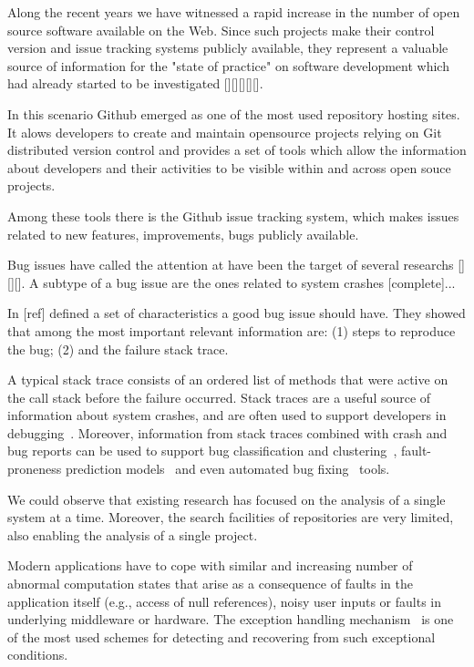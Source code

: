 \documentclass[conference]{IEEEtran}
\begin{document}
Along the recent years we have witnessed a rapid increase in 
the number of open source software  available on the Web.
Since such projects make their control version and 
issue tracking systems publicly available, they represent a valuable 
source of information for the "state of practice" on software development
which had already started to be investigated [][][][][].

In this scenario Github emerged as one of the most used repository hosting sites.
It  alows developers to create and maintain opensource projects relying on Git distributed version 
control and provides a set of tools which allow the information about developers 
and their activities to be visible within and across open souce projects.

Among these tools there is the Github issue tracking system, which makes
issues related to new features, improvements, bugs publicly available.

Bug issues have called the attention at have been the target of several 
researchs [][][]. A subtype of a bug issue are the ones related to system 
crashes [complete]...

In [ref] defined a set of characteristics a good bug issue should have. They showed that among 
the most important relevant information are: (1) steps to reproduce the bug; 
(2) and the failure stack trace.

A typical stack trace consists of an ordered list of methods that
were active on the call stack before the failure occurred. Stack traces
are a useful source of information about system crashes, and are often used to
support developers in debugging~\cite{schroter2010stack}. Moreover, information
from stack traces combined with crash and bug reports can be used to support bug
classification and clustering~\cite{wang2013improving, kim2011crash,
dhaliwal2011classifying}, fault-proneness prediction
models~\cite{kim2013predicting} and even automated bug
fixing~\cite{sinha2009fault} tools.

We could observe that existing research has focused on the analysis of a 
single system at a time. Moreover, the search facilities of repositories are very limited, also
enabling the analysis of a single project.

Modern applications have to cope with similar and increasing number of abnormal
computation states that arise as a consequence of faults in the application
itself (e.g., access of null references), noisy user inputs or faults in
underlying middleware or hardware. The exception handling mechanism~\cite{goodenough1975exception} is one of the most used schemes for detecting and recovering from such exceptional conditions. 
\end{document}
